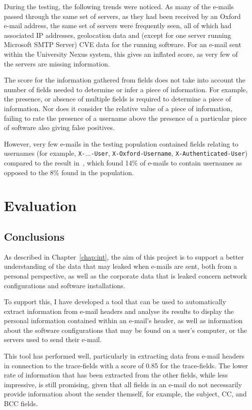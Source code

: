 During the testing, the following trends were noticed.  As many of the e-mails
passed through the same set of servers, as they had been received by an Oxford
e-mail address, the same set of servers were frequently seen, all of which had
associated IP addresses, geolocation data and (except for one server running
Microsoft SMTP Server) CVE data for the running software.  For an e-mail sent
within the University Nexus system, this gives an inflated score, as very few
of the servers are missing information.

The score for the information gathered from fields does not take into account
the number of fields needed to determine or infer a piece of information. For
example, the presence, or absence of multiple fields is required to determine a
piece of information.  Nor does it consider the relative value of a piece of
information, failing to rate the presence of a username above the presence of a
particular piece of software also giving false positives.

However, very few e-mails in the testing population contained fields relating
to usernames (for example, \texttt{X-}$\ldots$\texttt{-User}, \texttt{X-Oxford-Username},
\texttt{X-Authenticated-User}) compared to the result
in~\cite{nurse2015investigating}, which found 14\% of e-mails to contain
usernames as opposed to the 8\% found in the population.

\cleardoublepage \chapter{Evaluation}
\section{Conclusions}

As described in Chapter~\ref{chap:int}, the aim of this project is to support a
better understanding of the data that may leaked when e-mails are sent, both
from a personal perspective, as well as the corporate data that is leaked
concern network configurations and software installations.

To support this, I have developed a tool that can be used to automatically
extract information from e-mail headers and analyse its results to display the
personal information contained within an e-mail's header, as well as
information about the software configurations that may be found on a user's
computer, or the servers used to send their e-mail.

This tool has performed well, particularly in extracting data from e-mail
headers in connection to the trace-fields with a score of 0.85 for the
trace-fields.  The lower rate of information that has been extracted from
the other fields, while less impressive, is still promising, given that all
fields in an e-mail do not necessarily provide information about the sender
themself, for example, the subject, CC, and BCC fields.

